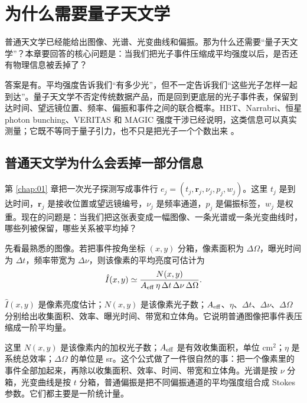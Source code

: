 \chapter{为什么需要量子天文学}
\label{chap:02}

\begin{chapteropening}
普通天文学已经能给出图像、光谱、光变曲线和偏振。那为什么还需要“量子天文学”？本章要回答的核心问题是：当我们把光子事件压缩成平均强度以后，是否还有物理信息被丢掉了？

答案是有。平均强度告诉我们“有多少光”，但不一定告诉我们“这些光子怎样一起到达”。量子天文学不否定传统数据产品，而是回到更底层的光子事件表，保留到达时间、望远镜位置、频率、偏振和事件之间的联合概率。HBT、Narrabri、恒星 photon bunching、VERITAS 和 MAGIC 强度干涉已经说明，这类信息可以真实测量；它既不等同于量子引力，也不只是把光子一个个数出来 \citep{1956Natur.178.1046H,1974iiia.book.....H,2017MNRAS.472.4126G,2020NatAs...4.1164A,2024MNRAS.529.4387A}。
\end{chapteropening}

\section{普通天文学为什么会丢掉一部分信息}
\label{sec:2-classical-products}
\label{sec:2-lost-correlations}

第 \ref{chap:01} 章把一次光子探测写成事件行 \(e_j=(t_j,\bm r_j,\nu_j,p_j,w_j)\)。这里 \(t_j\) 是到达时间，\(\bm r_j\) 是接收位置或望远镜编号，\(\nu_j\) 是频率通道，\(p_j\) 是偏振标签，\(w_j\) 是权重。现在的问题是：当我们把这张表变成一幅图像、一条光谱或一条光变曲线时，哪些列被保留，哪些关系被平均掉？

先看最熟悉的图像。若把事件按角坐标 \((x,y)\) 分箱，像素面积为 \(\Delta\Omega\)，曝光时间为 \(\Delta t\)，频率带宽为 \(\Delta\nu\)，则该像素的平均亮度可估计为
\begin{equation}
  \hat I(x,y)\simeq
  \frac{N(x,y)}
       {A_{\rm eff}\,\eta\,\Delta t\,\Delta\nu\,\Delta\Omega}.
  \label{eq:ch02-image-intensity}
\end{equation}
\begin{formulaexplain}
\(\hat I(x,y)\) 是像素亮度估计；\(N(x,y)\) 是该像素光子数；\(A_{\rm eff}\)、\(\eta\)、\(\Delta t\)、\(\Delta\nu\)、\(\Delta\Omega\) 分别给出收集面积、效率、曝光时间、带宽和立体角。它说明普通图像把事件表压缩成一阶平均量。
\end{formulaexplain}
这里 \(N(x,y)\) 是该像素内的加权光子数；\(A_{\rm eff}\) 是有效收集面积，单位 \(\mathrm{cm^2}\)；\(\eta\) 是系统总效率；\(\Delta\Omega\) 的单位是 sr。这个公式做了一件很自然的事：把一个像素里的事件全部加起来，再除以收集面积、效率、时间、带宽和立体角。光谱是按 \(\nu\) 分箱，光变曲线是按 \(t\) 分箱，普通偏振是把不同偏振通道的平均强度组合成 Stokes 参数。它们都主要是一阶统计量。

